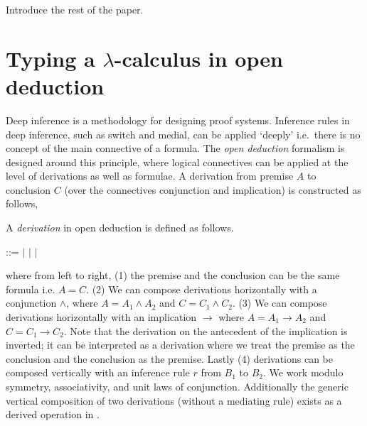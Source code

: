 \documentclass[a4paper,UKenglish,cleveref, autoref]{lipics-v2019}
\begin{document}
{\color{red} Introduce the rest of the paper.}

\section{Typing a $\lambda$-calculus in open deduction}

Deep inference is a methodology for designing proof systems. Inference rules in deep inference, such as switch and medial, can be applied `deeply' i.e.\ there is no concept of the main connective of a formula. The \emph{open deduction} formalism \cite{opendeduction10} is designed around this principle, where logical connectives can be applied at the level of derivations as well as formulae. A derivation from premise $A$ to conclusion $C$ (over the connectives conjunction and implication) is constructed as follows,
\begin{definition}
A \emph{derivation} in open deduction is defined as follows.
\begin{center}
\hspace{0.5cm}
::=
\hspace{0.5cm}
\hspace{0.2cm}
$\vert$
\hspace{0.2cm}
\hspace{0.2cm}
$\vert$
\hspace{0.2cm}
\hspace{0.2cm}
$\vert$
\hspace{0.2cm}
\end{center}
\end{definition}

\noindent where from left to right, (1) the premise and the conclusion can be the same formula i.e. $A = C$. (2) We can compose derivations horizontally with a conjunction $\wedge$, where $A = A_{1} \wedge A_{2}$ and $C = C_{1} \wedge C_{2}$. (3) We can compose derivations horizontally with an implication $\rightarrow$ where $A = A_{1} \rightarrow A_{2}$ and $C = C_{1} \rightarrow C_{2}$. Note that the derivation on the antecedent of the implication is inverted; it can be interpreted as a derivation where we treat the premise as the conclusion and the conclusion as the premise. Lastly (4) derivations can be composed vertically with an inference rule $r$ from $B_{1}$ to $B_{2}$. We work modulo symmetry, associativity, and unit laws of conjunction. Additionally the generic vertical composition of two derivations (without a mediating rule) exists as a derived operation in \cite{opendeduction10}.
\end{document}
